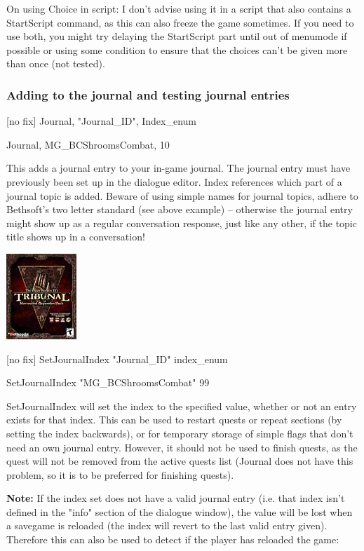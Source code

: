 \documentclass[
]{article}
\begin{document}
On using Choice in script: I don't advise using it in a script that also
contains a StartScript command, as this can also freeze the game
sometimes. If you need to use both, you might try delaying the
StartScript part until out of menumode if possible or using some
condition to ensure that the choices can't be given more than once (not
tested).

\hypertarget{adding-to-the-journal-and-testing-journal-entries}{%
\subsubsection{Adding to the journal and testing journal
entries}\label{adding-to-the-journal-and-testing-journal-entries}}

{[}no fix{]} Journal, "Journal\_ID", Index\_enum

Journal, MG\_BCShroomsCombat, 10

This adds a journal entry to your in-game journal. The journal entry
must have previously been set up in the dialogue editor. Index
references which part of a journal topic is added. Beware of using
simple names for journal topics, adhere to Bethsoft's two letter
standard (see above example) -- otherwise the journal entry might show
up as a regular conversation response, just like any other, if the topic
title shows up in a conversation!

\includegraphics{media/image6.png}

{[}no fix{]} SetJournalIndex "Journal\_ID" index\_enum

SetJournalIndex "MG\_BCShroomsCombat" 99

SetJournalIndex will set the index to the specified value, whether or
not an entry exists for that index. This can be used to restart quests
or repeat sections (by setting the index backwards), or for temporary
storage of simple flags that don't need an own journal entry. However,
it should not be used to finish quests, as the quest will not be removed
from the active quests list (Journal does not have this problem, so it
is to be preferred for finishing quests).

\textbf{Note:} If the index set does not have a valid journal entry
(i.e. that index isn't defined in the "info" section of the dialogue
window), the value will be lost when a savegame is reloaded (the index
will revert to the last valid entry given). Therefore this can also be
used to detect if the player has reloaded the game:
\end{document}
